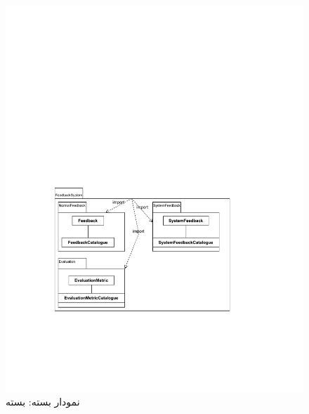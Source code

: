 \begin{figure}[ht!]
	\centering
	\includegraphics[scale=0.8]{figs/OOD-package-3.pdf}
	\caption{نمودار بسته: بسته }
\end{figure}
\FloatBarrier
\newpage

